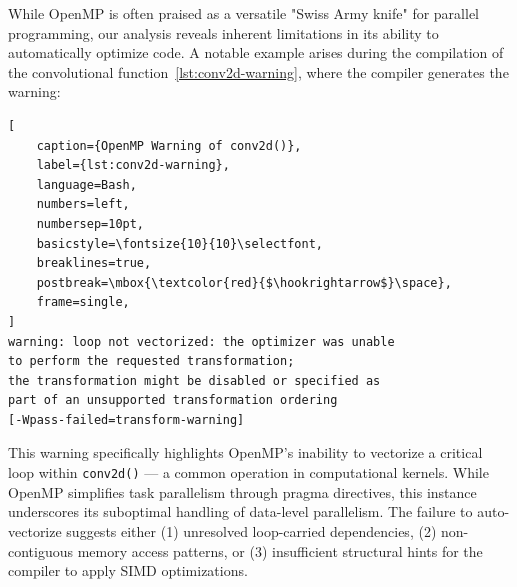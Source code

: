 \documentclass[modern,longauthor]{aastex7}
\begin{document}
While OpenMP is often praised as a versatile "Swiss Army knife" for parallel programming, our analysis reveals inherent limitations in its ability to automatically optimize code. A notable example arises during the compilation of the convolutional function~\ref{lst:conv2d-warning}, where the compiler generates the warning:
\begin{lstlisting}[
    caption={OpenMP Warning of conv2d()},
    label={lst:conv2d-warning},
    language=Bash,
    numbers=left,
    numbersep=10pt,
    basicstyle=\fontsize{10}{10}\selectfont,
    breaklines=true,
    postbreak=\mbox{\textcolor{red}{$\hookrightarrow$}\space},
    frame=single,
]
warning: loop not vectorized: the optimizer was unable
to perform the requested transformation; 
the transformation might be disabled or specified as
part of an unsupported transformation ordering 
[-Wpass-failed=transform-warning]
\end{lstlisting}
This warning specifically highlights OpenMP's inability to vectorize a critical loop within \texttt{conv2d()} — a common operation in computational kernels. While OpenMP simplifies task parallelism through pragma directives, this instance underscores its suboptimal handling of data-level parallelism. The failure to auto-vectorize suggests either (1) unresolved loop-carried dependencies, (2) non-contiguous memory access patterns, or (3) insufficient structural hints for the compiler to apply SIMD optimizations.
\end{document}
